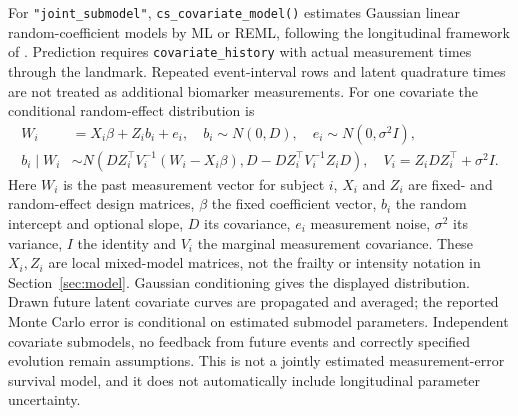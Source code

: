 \documentclass[article,nojss]{jss}
\newcommand{\code}[1]{\texttt{#1}}
\begin{document}
For \code{"joint\_submodel"}, \code{cs\_covariate\_model()} estimates Gaussian linear random-coefficient models by ML or REML, following the longitudinal framework of \citet{Laird1982}. Prediction requires \code{covariate\_history} with actual measurement times through the landmark. Repeated event-interval rows and latent quadrature times are not treated as additional biomarker measurements. For one covariate the conditional random-effect distribution is
\begin{equation}\label{eq:covariate}
 \begin{aligned}
 W_i&=X_i\beta+Z_i b_i+e_i,\quad b_i\sim N(0,D),\quad e_i\sim N(0,\sigma^2 I),\\
 b_i\mid W_i&\sim N\!\left(DZ_i^\top V_i^{-1}(W_i-X_i\beta),
 D-DZ_i^\top V_i^{-1}Z_iD\right),\quad V_i=Z_iDZ_i^\top+\sigma^2I.
 \end{aligned}
\end{equation}
Here $W_i$ is the past measurement vector for subject $i$, $X_i$ and $Z_i$ are fixed- and random-effect design matrices, $\beta$ the fixed coefficient vector, $b_i$ the random intercept and optional slope, $D$ its covariance, $e_i$ measurement noise, $\sigma^2$ its variance, $I$ the identity and $V_i$ the marginal measurement covariance. These $X_i,Z_i$ are local mixed-model matrices, not the frailty or intensity notation in Section~\ref{sec:model}. Gaussian conditioning gives the displayed distribution. Drawn future latent covariate curves are propagated and averaged; the reported Monte Carlo error is conditional on estimated submodel parameters. Independent covariate submodels, no feedback from future events and correctly specified evolution remain assumptions. This is not a jointly estimated measurement-error survival model, and it does not automatically include longitudinal parameter uncertainty.
\end{document}
